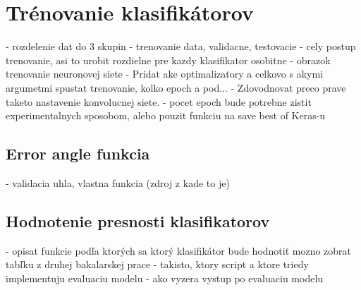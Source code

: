 
\section{Trénovanie klasifikátorov}
\label{sec:trenovanie}
- rozdelenie dat do 3 skupin - trenovanie data, validacne, testovacie
- cely postup trenovanie, asi to urobit rozdielne pre kazdy klasifikator osobitne
- obrazok trenovanie neuronovej siete
- Pridat ake optimalizatory a celkovo s akymi argumetmi spustat trenovanie, kolko epoch a pod...
- Zdovodnovat preco prave taketo nastavenie konvolucnej siete.
- pocet epoch bude potrebne zistit experimentalnych sposobom, alebo pouzit funkciu na save best of Keras-u

\subsection{Error angle funkcia}
\label{subsec:errorangle}
- validacia uhla, vlastna funkcia (zdroj z kade to je)

\subsection{Hodnotenie presnosti klasifikatorov}
\label{subsec:hodnoteniepresnosti}
- opisat funkcie podľa ktorých sa ktorý klasifikátor bude hodnotiť
  mozno zobrat tabľku z druhej bakalarskej prace
- takisto, ktory script a ktore triedy implementuju evaluaciu modelu
- ako vyzera vystup po evaluaciu modelu
